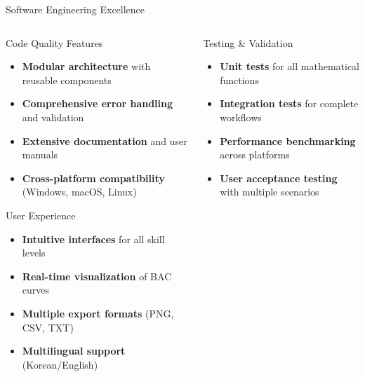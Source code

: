 \documentclass[aspectratio=169]{beamer}
\newcommand{\highlight}[1]{\textcolor{kentech_orange}{\textbf{#1}}}
\begin{document}
\begin{frame}{Software Engineering Excellence}
    \begin{columns}
        \begin{column}{0.5\textwidth}
            \begin{block}{Code Quality Features}
                \begin{itemize}
                    \item \highlight{Modular architecture} with reusable components
                    \item \highlight{Comprehensive error handling} and validation
                    \item \highlight{Extensive documentation} and user manuals
                    \item \highlight{Cross-platform compatibility} (Windows, macOS, Linux)
                \end{itemize}
            \end{block}
            
            \begin{block}{User Experience}
                \begin{itemize}
                    \item \highlight{Intuitive interfaces} for all skill levels
                    \item \highlight{Real-time visualization} of BAC curves
                    \item \highlight{Multiple export formats} (PNG, CSV, TXT)
                    \item \highlight{Multilingual support} (Korean/English)
                \end{itemize}
            \end{block}
        \end{column}
        
        \begin{column}{0.5\textwidth}
            \begin{block}{Testing \& Validation}
                \begin{itemize}
                    \item \highlight{Unit tests} for all mathematical functions
                    \item \highlight{Integration tests} for complete workflows
                    \item \highlight{Performance benchmarking} across platforms
                    \item \highlight{User acceptance testing} with multiple scenarios
                \end{itemize}
            \end{block}
            

\end{column}
\end{columns}
\end{frame}
\end{document}
